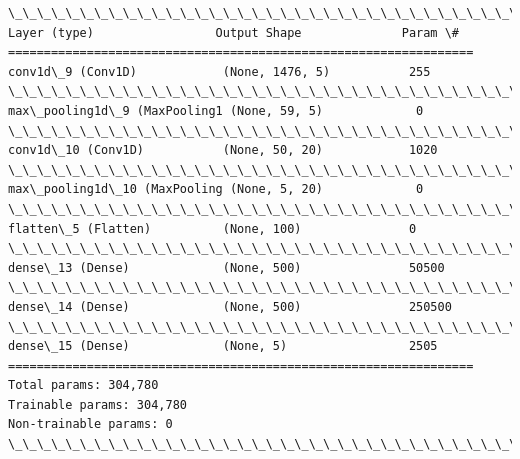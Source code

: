 \documentclass[11pt]{article}
\begin{document}
    \begin{Verbatim}[commandchars=\\\{\}]
\_\_\_\_\_\_\_\_\_\_\_\_\_\_\_\_\_\_\_\_\_\_\_\_\_\_\_\_\_\_\_\_\_\_\_\_\_\_\_\_\_\_\_\_\_\_\_\_\_\_\_\_\_\_\_\_\_\_\_\_\_\_\_\_\_
Layer (type)                 Output Shape              Param \#   
=================================================================
conv1d\_9 (Conv1D)            (None, 1476, 5)           255       
\_\_\_\_\_\_\_\_\_\_\_\_\_\_\_\_\_\_\_\_\_\_\_\_\_\_\_\_\_\_\_\_\_\_\_\_\_\_\_\_\_\_\_\_\_\_\_\_\_\_\_\_\_\_\_\_\_\_\_\_\_\_\_\_\_
max\_pooling1d\_9 (MaxPooling1 (None, 59, 5)             0         
\_\_\_\_\_\_\_\_\_\_\_\_\_\_\_\_\_\_\_\_\_\_\_\_\_\_\_\_\_\_\_\_\_\_\_\_\_\_\_\_\_\_\_\_\_\_\_\_\_\_\_\_\_\_\_\_\_\_\_\_\_\_\_\_\_
conv1d\_10 (Conv1D)           (None, 50, 20)            1020      
\_\_\_\_\_\_\_\_\_\_\_\_\_\_\_\_\_\_\_\_\_\_\_\_\_\_\_\_\_\_\_\_\_\_\_\_\_\_\_\_\_\_\_\_\_\_\_\_\_\_\_\_\_\_\_\_\_\_\_\_\_\_\_\_\_
max\_pooling1d\_10 (MaxPooling (None, 5, 20)             0         
\_\_\_\_\_\_\_\_\_\_\_\_\_\_\_\_\_\_\_\_\_\_\_\_\_\_\_\_\_\_\_\_\_\_\_\_\_\_\_\_\_\_\_\_\_\_\_\_\_\_\_\_\_\_\_\_\_\_\_\_\_\_\_\_\_
flatten\_5 (Flatten)          (None, 100)               0         
\_\_\_\_\_\_\_\_\_\_\_\_\_\_\_\_\_\_\_\_\_\_\_\_\_\_\_\_\_\_\_\_\_\_\_\_\_\_\_\_\_\_\_\_\_\_\_\_\_\_\_\_\_\_\_\_\_\_\_\_\_\_\_\_\_
dense\_13 (Dense)             (None, 500)               50500     
\_\_\_\_\_\_\_\_\_\_\_\_\_\_\_\_\_\_\_\_\_\_\_\_\_\_\_\_\_\_\_\_\_\_\_\_\_\_\_\_\_\_\_\_\_\_\_\_\_\_\_\_\_\_\_\_\_\_\_\_\_\_\_\_\_
dense\_14 (Dense)             (None, 500)               250500    
\_\_\_\_\_\_\_\_\_\_\_\_\_\_\_\_\_\_\_\_\_\_\_\_\_\_\_\_\_\_\_\_\_\_\_\_\_\_\_\_\_\_\_\_\_\_\_\_\_\_\_\_\_\_\_\_\_\_\_\_\_\_\_\_\_
dense\_15 (Dense)             (None, 5)                 2505      
=================================================================
Total params: 304,780
Trainable params: 304,780
Non-trainable params: 0
\_\_\_\_\_\_\_\_\_\_\_\_\_\_\_\_\_\_\_\_\_\_\_\_\_\_\_\_\_\_\_\_\_\_\_\_\_\_\_\_\_\_\_\_\_\_\_\_\_\_\_\_\_\_\_\_\_\_\_\_\_\_\_\_\_

    \end{Verbatim}

    \begin{center}
    \end{center}
    { \hspace*{\fill} \\}
    
    \begin{center}
    \end{center}
    { \hspace*{\fill} \\}
    
\end{document}
